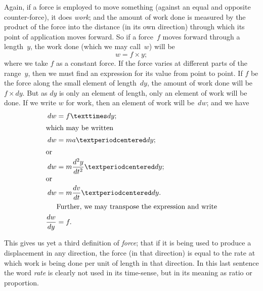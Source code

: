 \documentclass[12pt]{book}[2005/09/16]
\newcommand{\DPPageSep}[2]{\Pagelabel{#2}}
\newcommand{\Pagelabel}[1]
  {\phantomsection\label{#1}}
\begin{document}
Again, if a force is employed to move something
(against an equal and opposite counter-force), it does
\emph{work}; and the amount of work done is measured by
the product of the force into the distance (in its
own direction) through which its point of application
moves forward. So if a force~$f$ moves forward
through a length~$y$, the work done (which we may
call~$w$) will be
\[
w = f × y;
\]
where we take $f$ as a constant force. If the force
varies at different parts of the range~$y$, then we must
find an expression for its value from point to point.
If $f$ be the force along the small element of length~$dy$,
the amount of work done will be $f × dy$. But as
$dy$ is only an element of length, only an element of
\DPPageSep{070.png}{58}%
work will be done. If we write $w$ for work, then an
element of work will be~$dw$; and we have
\begin{align*}
dw &= f × dy; \\
\intertext{which may be written}
dw &= ma·dy; \\
\intertext{or}
dw &= m \frac{d^2y}{dt^2}· dy; \\
\intertext{or}
dw &= m \frac{dv}{dt}· dy.     \\
\intertext{\indent Further, we may transpose the expression and write}
\frac{dw}{dy} &= f.
\end{align*}

This gives us yet a third definition of \emph{force}; that
if it is being used to produce a displacement in any
direction, the force (in that direction) is equal to the
rate at which work is being done per unit of length
in that direction. In this last sentence the word
\emph{rate} is clearly not used in its time-sense, but in its
meaning as ratio or proportion.
\end{document}

